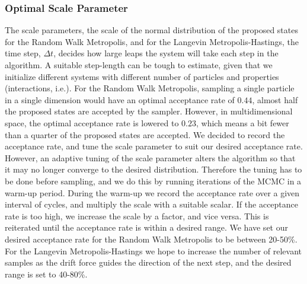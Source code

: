 \subsubsection{Optimal Scale Parameter}\label{sec:tuning}


The scale parameters, the scale of the normal distribution of the proposed states for the Random Walk Metropolis, and for the Langevin Metropolis-Hastings, the time step, $\Delta t$, decides how large leaps the system will take each step in the algorithm. A suitable step-length can be tough to estimate, given that we initialize different systems with different number of particles and properties (interactions, i.e.). For the Random Walk Metropolis, sampling a single particle in a single dimension would have an optimal acceptance rate of $0.44$, almost half the proposed states are accepted by the sampler. However, in multidimensional space, the optimal acceptance rate is lowered to $0.23$, which means a bit fewer than a quarter of the proposed states are accepted. We decided to record the acceptance rate, and tune the scale parameter to suit our desired acceptance rate. However, an adaptive tuning of the scale parameter alters the algorithm so that it may no longer converge to the desired distribution. Therefore the tuning has to be done before sampling, and we do this by running iterations of the MCMC in a warm-up period. During the warm-up we record the acceptance rate over a given interval of cycles, and multiply the scale with a suitable scalar. If the acceptance rate is too high, we increase the scale by a factor, and vice versa. This is reiterated until the acceptance rate is within a desired range. We have set our desired acceptance rate for the Random Walk Metropolis to be between 20-50\%. For the Langevin Metropolis-Hastings we hope to increase the number of relevant samples as the drift force guides the direction of the next step, and the desired range is set to 40-80\%.


